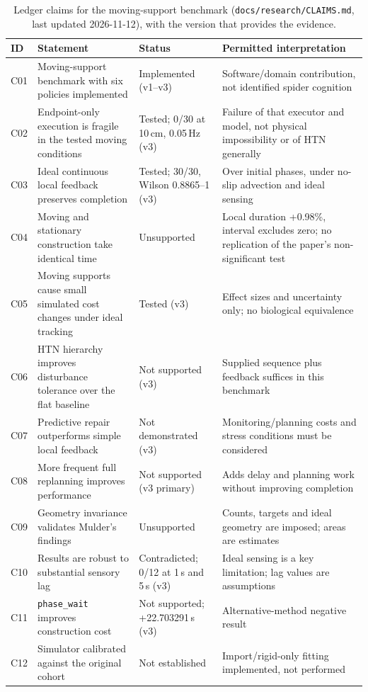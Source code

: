 \begin{table}[H]
\centering
\small
\begin{tabularx}{\linewidth}{@{}l X l X@{}}
\toprule
ID & Statement & Status & Permitted interpretation \\
\midrule
C01 & Moving-support benchmark with six policies implemented & Implemented (v1--v3) & Software/domain contribution, not identified spider cognition \\
C02 & Endpoint-only execution is fragile in the tested moving conditions & Tested; 0/30 at 10\,cm, 0.05\,Hz (v3) & Failure of that executor and model, not physical impossibility or of HTN generally \\
C03 & Ideal continuous local feedback preserves completion & Tested; 30/30, Wilson 0.8865--1 (v3) & Over initial phases, under no-slip advection and ideal sensing \\
C04 & Moving and stationary construction take identical time & Unsupported & Local duration +0.98\%, interval excludes zero; no replication of the paper's non-significant test \\
C05 & Moving supports cause small simulated cost changes under ideal tracking & Tested (v3) & Effect sizes and uncertainty only; no biological equivalence \\
C06 & HTN hierarchy improves disturbance tolerance over the flat baseline & Not supported (v3) & Supplied sequence plus feedback suffices in this benchmark \\
C07 & Predictive repair outperforms simple local feedback & Not demonstrated (v3) & Monitoring/planning costs and stress conditions must be considered \\
C08 & More frequent full replanning improves performance & Not supported (v3 primary) & Adds delay and planning work without improving completion \\
C09 & Geometry invariance validates Mulder's findings & Unsupported & Counts, targets and ideal geometry are imposed; areas are estimates \\
C10 & Results are robust to substantial sensory lag & Contradicted; 0/12 at 1\,s and 5\,s (v3) & Ideal sensing is a key limitation; lag values are assumptions \\
C11 & \texttt{phase\_\allowbreak{}wait} improves construction cost & Not supported; +22.703291\,s (v3) & Alternative-method negative result \\
C12 & Simulator calibrated against the original cohort & Not established & Import/rigid-only fitting implemented, not performed \\
\bottomrule
\end{tabularx}
\caption{Ledger claims for the moving-support benchmark (\texttt{docs/\allowbreak{}research/\allowbreak{}CLAIMS.md}, last updated
2026-11-12), with the version that provides the evidence.}
\label{tab:mulder-claims}
\end{table}

